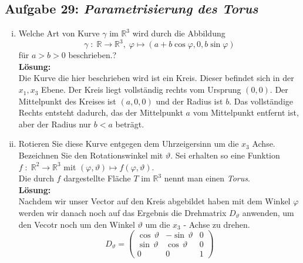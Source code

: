 \subsection*{Aufgabe 29: \mdseries\itshape Parametrisierung des Torus}

\begin{enumerate}[(i)]
	\item Welche Art von Kurve $\gamma$ im $\mathbb{R}^3$ wird durch die Abbildung
	$$
		\gamma \; : \; \mathbb{R} \rightarrow \mathbb{R}^3, \; \varphi \mapsto (a + b\cos \varphi,0,b\sin\varphi)
	$$
	für $a>b>0$ beschrieben.?\\

	\textbf{Lösung:}\\
		Die Kurve die hier beschrieben wird ist ein Kreis. Dieser befindet sich in der $x_1,x_3$ Ebene. Der Kreis
		liegt vollständig rechts vom Ursprung $(0,0)$. Der Mittelpunkt des Kreises ist $(a,0,0)$ und der Radius ist
		$b$. Das vollständige Rechts entsteht dadurch, das der Mittelpunkt $a$ vom Mittelpunkt entfernt ist,
		aber der Radius nur $b<a$ beträgt.

	\item Rotieren Sie diese Kurve entgegen dem Uhrzeigersinn um die $x_3$ Achse. Bezeichnen Sie den Rotationswinkel
	mit $\vartheta$. Sei erhalten so eine Funktion $f \; : \; \mathbb{R}^2 \rightarrow \mathbb{R}^3$ mit
	$(\varphi,\vartheta) \mapsto f (\varphi, \vartheta)$.\\

	Die durch $f$ dargestellte Fläche $T$ im $\mathbb{R}^3$ nennt man einen \emph{Torus}.\\

	\textbf{Lösung:}\\
		Nachdem wir unser Vector auf den Kreis abgebildet haben mit dem Winkel $\varphi$ werden wir danach
		noch auf das Ergebnis die Drehmatrix $D_\vartheta$ anwenden, um den Vecotr noch um den Winkel $\vartheta$ um
		die $x_3$ - Achse zu drehen.\\

		$$
			D_\vartheta = \begin{pmatrix}
				\cos \, \vartheta & - \sin \, \vartheta & 0\\
				\sin \, \vartheta & \cos \, \vartheta  & 0\\
				0 & 0 & 1
			\end{pmatrix}
		$$


\end{enumerate}
